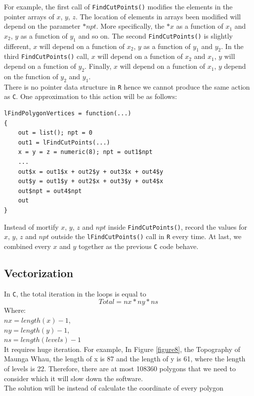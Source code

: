 \documentclass[paper=a4, fontsize=11pt]{report}
\begin{document}
For example, the first call of \texttt{FindCutPoints()} modifies the elements in the pointer arrays of $x$, $y$, $z$. The location of elements in arrays been modified will depend on the parameter $*npt$. More specifically, the $*x$ as a function of $x_1$ and $x_2$, $y$ as a function of $y_1$ and so on. The second \texttt{FindCutPoints()} is slightly different, $x$ will depend on a function of $x_2$, $y$ as a function of $y_1$ and $y_2$. In the third \texttt{FindCutPoints()} call, $x$ will depend on a function of $x_2$ and $x_1$, $y$ will depend on a function of $y_2$. Finally, $x$ will depend on a function of $x_1$, $y$ depend on the function of $y_2$ and $y_1$. \\

There is no pointer data structure in \texttt{R} hence we cannot produce the same action as \texttt{C}. One approximation to this action will be as follows:
\begin{lstlisting}
lFindPolygonVertices = function(...)
{
    out = list(); npt = 0
    out1 = lFindCutPoints(...)
    x = y = z = numeric(8); npt = out1$npt
    ...
    out$x = out1$x + out2$y + out3$x + out4$y
    out$y = out1$y + out2$x + out3$y + out4$x
    out$npt = out4$npt
    out
}
\end{lstlisting}
Instead of mortify $x$, $y$, $z$ and $npt$ inside \texttt{FindCutPoints()}, record the values for $x$, $y$, $z$ and $npt$ outside the \texttt{lFindCutPoints()} call in \texttt{R} every time. At last, we combined every $x$ and $y$ together as the previous \texttt{C} code behave. 


\subsection{Vectorization}
In \texttt{C}, the total iteration in the loops is equal to
\begin{equation}
Total = nx * ny * ns
\end{equation}
Where:\\
$nx = length(x) - 1$,\\
$ny = length(y) - 1$,\\
$ns = length(levels) - 1$\\
It requires huge iteration. For example, In Figure \ref{figure8}, the Topography of Maunga Whau, the length of x is 87 and the length of y is 61, where the length of levels is 22. Therefore, there are at most 108360 polygons that we need to consider which it will slow down the software. \\
The solution will be instead of calculate the coordinate of every polygon 
\end{document}
